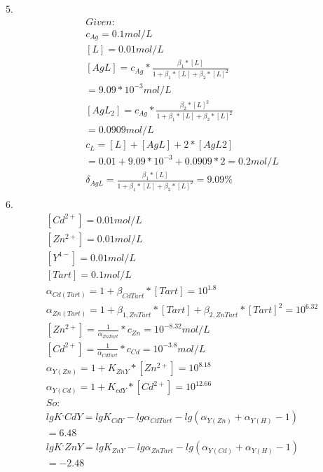 \documentclass{article}
\begin{document}
5.\begin{equation}
    \begin{multlined}
        Given:\\
        c_{Ag} = 0.1 mol/L\\
        [L] = 0.01 mol/L\\
        [AgL] = c_{Ag} * \frac{\beta_1*[L]}{1 + \beta_1*[L] + \beta_2*[L]^2}\\
        =9.09*10^{-3} mol/L\\
        [AgL_2] = c_{Ag} * \frac{\beta_2*[L]^2}{1 + \beta_1*[L] + \beta_2*[L]^2}\\
        =0.0909 mol/L\\
        c_L = [L] + [AgL] + 2*[AgL2]\\
        = 0.01 + 9.09 * 10^{-3} + 0.0909 * 2 = 0.2 mol/L\\
        \delta_{AgL} = \frac{\beta_1*[L]}{1 + \beta_1*[L] + \beta_2*[L]^2} = 9.09\%\\
    \end{multlined}
\end{equation}
6.\begin{equation}
    \begin{multlined}
        [Cd^{2+}] = 0.01 mol/L\\
        [Zn^{2+}] = 0.01 mol/L\\
        [Y^{4-}] = 0.01 mol/L\\
        [Tart] = 0.1 mol/L\\
        \alpha_{Cd(Tart)} = 1 + \beta_{CdTart}*[Tart] = 10^{1.8}\\
        \alpha_{Zn(Tart)} = 1 + \beta_{1, ZnTart}*[Tart] + \beta_{2, ZnTart}*[Tart]^2 = 10^{6.32}\\
        [Zn^{2+}] = \frac{1}{\alpha_{ZnTart}}*c_{Zn} = 10^{-8.32}mol/L\\
        [Cd^{2+}] = \frac{1}{\alpha_{CdTart}}*c_{Cd} = 10^{-3.8}mol/L\\
        \alpha_{Y(Zn)} = 1 + K_{ZnY}*[Zn^{2+}] = 10^{8.18}\\
        \alpha_{Y(Cd)} = 1 + K_{cdY}*[Cd^{2+}] = 10^{12.66}\\
        So:\\
        lgK^{,}CdY = lgK_{CdY} - lg\alpha_{CdTart} - lg(\alpha_{Y(Zn)}+\alpha_{Y(H)} - 1)\\
        = 6.48\\
        lgK^{,}ZnY = lgK_{ZnY} - lg \alpha_{ZnTart} - lg(\alpha_{Y(Cd)}+\alpha_{Y(H)} - 1)\\
        = -2.48\\
    \end{multlined}
\end{equation}
\end{document}

